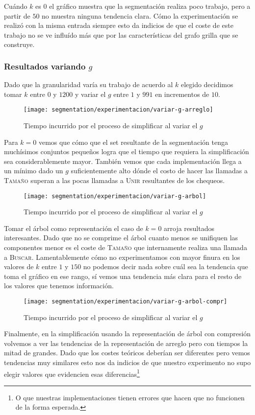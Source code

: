Cuándo $k$ es $0$ el gráfico muestra que la segmentación realiza poco trabajo,
pero a partir de $50$ no muestra ninguna tendencia clara. Cómo la
experimentación se realizó con la misma entrada siempre esto da indicios de que
el coste de este trabajo no se ve influído más que por las características del
grafo grilla que se construye.

\subsubsection{Resultados variando $g$}

Dado que la granularidad varía su trabajo de acuerdo al $k$ elegido decidimos
tomar $k$ entre $0$ y $1200$ y variar el $g$ entre $1$ y $991$ en incrementos
de $10$.

\begin{figure}[h]
	\centering
	\texttt{[image: segmentation/experimentacion/variar-g-arreglo]}
	\caption{Tiempo incurrido por el proceso de simplificar al variar el $g$}
\end{figure}

Para $k=0$ vemos que cómo que el set resultante de la segmentación tenga
muchísimos conjuntos pequeños logra que el tiempo que requiera la
simplificación sea considerablemente mayor. También vemos que cada
implementación llega a un mínimo dado un $g$ suficientemente alto dónde el
costo de hacer las llamadas a \textsc{Tamaño} superan a las pocas llamadas a
\textsc{Unir} resultantes de los chequeos.

\begin{figure}[h]
	\centering
	\texttt{[image: segmentation/experimentacion/variar-g-arbol]}
	\caption{Tiempo incurrido por el proceso de simplificar al variar el $g$}
\end{figure}

Tomar el árbol como representación el caso de $k=0$ arroja resultados
interesantes. Dado que no se comprime el árbol cuanto menos se unifiquen las
componentes menor es el coste de \textsc{Tamaño} que internamente realiza una
llamada a \textsc{Buscar}. Lamentablemente cómo no experimentamos con mayor
finura en los valores de $k$ entre $1$ y $150$ no podemos decir nada sobre cuál
sea la tendencia que toma el gráfico en ese rango, sí vemos una tendencia más
clara para el resto de los valores que tenemos información.

\clearpage

\begin{figure}[h]
	\centering
	\texttt{[image: segmentation/experimentacion/variar-g-arbol-compr]}
	\caption{Tiempo incurrido por el proceso de simplificar al variar el $g$}
\end{figure}

Finalmente, en la simplificación usando la representación de árbol con
compresión volvemos a ver las tendencias de la representación de arreglo pero
con tiempos la mitad de grandes. Dado que los costes teóricos deberían ser
diferentes pero vemos tendencias muy similares esto nos da indicios de que
nuestro experimento no supo elegir valores que evidencien esas
diferencias\footnote{O que nuestras implementaciones tienen errores que hacen
que no funcionen de la forma esperada.}
